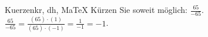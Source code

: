 \begin{MAufgabe}{Kuerzen}{kr, dh, MaTeX}
K\"urzen Sie soweit m\"oglich: $\frac{65}{-65}$.\\ 
\ifLsg\MLoesung
\quad $\frac{65}{-65}=\frac{(65)\cdot(1)}{(65)\cdot(-1)}=\frac{1}{-1}=-1$.\else\relax\fi
 \end{MAufgabe}